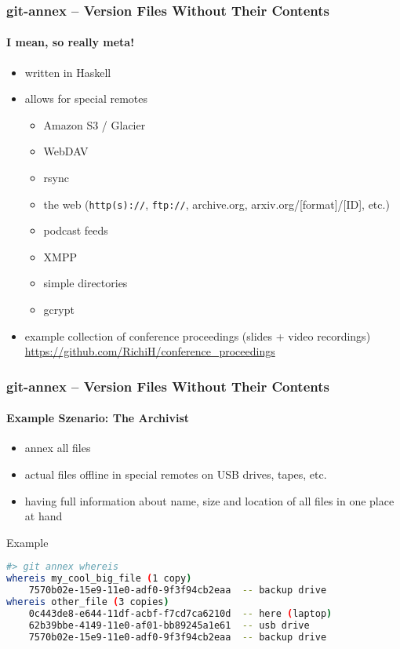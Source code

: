 \documentclass[english,hyperref={pdfpagelabels=false},aspectratio=169]{beamer}
\begin{document}
\begin{frame}
  \frametitle{git-annex -- Version Files Without Their Contents}
  \framesubtitle{I mean, so really meta!}
  \begin{itemize}
    \item written in Haskell
    \item allows for special remotes
      \begin{itemize}
        \item Amazon S3 / Glacier
        \item WebDAV
        \item rsync
        \item the web {\scriptsize\color{fzjgray50}(\texttt{http(s)://}, \texttt{ftp://}, archive.org, arxiv.org/[format]/[ID], etc.)}
        \item podcast feeds
        \item XMPP
        \item simple directories
        \item gcrypt
      \end{itemize}
    \item example collection of conference proceedings {\scriptsize\color{fzjgray50}(slides + video recordings)}\\
      {\scriptsize \url{https://github.com/RichiH/conference_proceedings}}
  \end{itemize}
\end{frame}


\begin{frame}[fragile]
  \frametitle{git-annex -- Version Files Without Their Contents}
  \framesubtitle{Example Szenario: The Archivist}
  \begin{itemize}
    \item annex all files
    \item actual files offline in special remotes on USB drives, tapes, etc.
    \item having full information about name, size and location of all files in one place at hand
  \end{itemize}
  
  \begin{block}{Example}
    \vspace{-0.75em}
    \begin{lstlisting}[language=bash,basicstyle=\scriptsize\ttfamily,commentstyle=\normalfont\ttfamily\color{fzjgray50}]
#> git annex whereis
whereis my_cool_big_file (1 copy)
    7570b02e-15e9-11e0-adf0-9f3f94cb2eaa  -- backup drive
whereis other_file (3 copies)
    0c443de8-e644-11df-acbf-f7cd7ca6210d  -- here (laptop)
    62b39bbe-4149-11e0-af01-bb89245a1e61  -- usb drive
    7570b02e-15e9-11e0-adf0-9f3f94cb2eaa  -- backup drive
    \end{lstlisting}
    \vspace{-0.75em}
  \end{block}
\end{frame}
\end{document}
